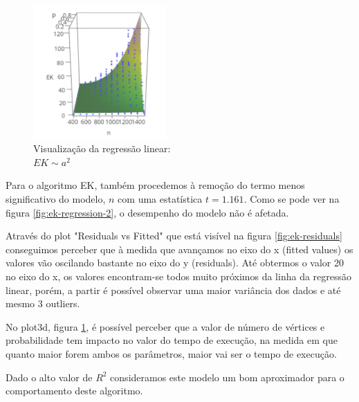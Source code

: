 \documentclass{uofa-eng-assignment}
\begin{document}
\begin{figure}
\centering
\includegraphics[width=0.45\textwidth]{ek_a^2_plot_lm.png}
\captionsetup{justification=centering}
\caption{Visualização da regressão linear: \\$EK \sim a^2$}
\label{fig:plot3d-ek}
\end{figure}

Para o algoritmo EK, também procedemos à remoção do termo menos significativo do modelo, $n$ com uma estatística $t=1.161$. Como se pode ver na figura \ref{fig:ek-regression-2}, o desempenho do modelo não é afetada.

Através do plot "Residuals vs Fitted" que está visível na figura \ref{fig:ek-residuals} conseguimos perceber que à medida que avançamos no eixo do x (fitted values) os valores vão oscilando bastante no eixo do y (residuals). Até obtermos o valor 20 no eixo do x, os valores encontram-se todos muito próximos da linha da regressão linear, porém, a partir é possível observar uma maior variância dos dados e até mesmo 3 outliers.

No plot3d, figura \ref{fig:plot3d-ek}, é possível perceber que a valor de número de vértices e probabilidade tem impacto no valor do tempo de execução, na medida em que quanto maior forem ambos os parâmetros, maior vai ser o tempo de execução.

Dado o alto valor de $R^2$ consideramos este modelo um bom aproximador para o comportamento deste algoritmo.
\end{document}
